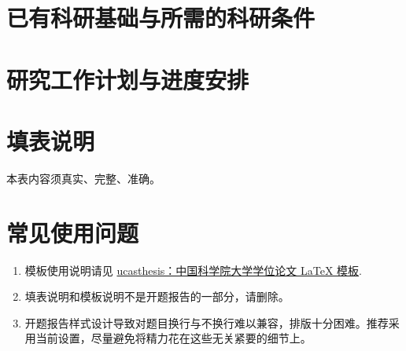\section{已有科研基础与所需的科研条件}

\section{研究工作计划与进度安排}

\section*{填表说明}

本表内容须真实、完整、准确。

\section*{常见使用问题}

\begin{enumerate}
    \item 模板使用说明请见 \href{https://github.com/mohuangrui/ucasthesis}{ucasthesis：中国科学院大学学位论文 LaTeX 模板}.
    \item 填表说明和模板说明不是开题报告的一部分，请删除。
    \item 开题报告样式设计导致对题目换行与不换行难以兼容，排版十分困难。推荐采用当前设置，尽量避免将精力花在这些无关紧要的细节上。
\end{enumerate}

\nocite{*}%
